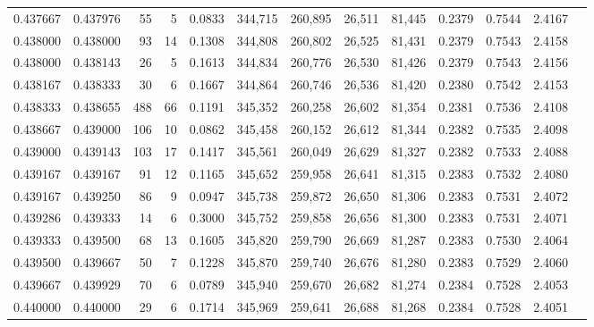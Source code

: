 \begin{tabular}{rrrrrrrrrrrrr}
0.437667 & 0.437976 &    55 &   5 &                                     0.0833 & 344,715 & 260,895 &  26,511 &  81,445 & 0.2379 & 0.7544 & 2.4167 \\
0.438000 & 0.438000 &    93 &  14 &                                     0.1308 & 344,808 & 260,802 &  26,525 &  81,431 & 0.2379 & 0.7543 & 2.4158 \\
0.438000 & 0.438143 &    26 &   5 &                                     0.1613 & 344,834 & 260,776 &  26,530 &  81,426 & 0.2379 & 0.7543 & 2.4156 \\
0.438167 & 0.438333 &    30 &   6 &                                     0.1667 & 344,864 & 260,746 &  26,536 &  81,420 & 0.2380 & 0.7542 & 2.4153 \\
0.438333 & 0.438655 &   488 &  66 &                                     0.1191 & 345,352 & 260,258 &  26,602 &  81,354 & 0.2381 & 0.7536 & 2.4108 \\
0.438667 & 0.439000 &   106 &  10 &                                     0.0862 & 345,458 & 260,152 &  26,612 &  81,344 & 0.2382 & 0.7535 & 2.4098 \\
0.439000 & 0.439143 &   103 &  17 &                                     0.1417 & 345,561 & 260,049 &  26,629 &  81,327 & 0.2382 & 0.7533 & 2.4088 \\
0.439167 & 0.439167 &    91 &  12 &                                     0.1165 & 345,652 & 259,958 &  26,641 &  81,315 & 0.2383 & 0.7532 & 2.4080 \\
0.439167 & 0.439250 &    86 &   9 &                                     0.0947 & 345,738 & 259,872 &  26,650 &  81,306 & 0.2383 & 0.7531 & 2.4072 \\
0.439286 & 0.439333 &    14 &   6 &                                     0.3000 & 345,752 & 259,858 &  26,656 &  81,300 & 0.2383 & 0.7531 & 2.4071 \\
0.439333 & 0.439500 &    68 &  13 &                                     0.1605 & 345,820 & 259,790 &  26,669 &  81,287 & 0.2383 & 0.7530 & 2.4064 \\
0.439500 & 0.439667 &    50 &   7 &                                     0.1228 & 345,870 & 259,740 &  26,676 &  81,280 & 0.2383 & 0.7529 & 2.4060 \\
0.439667 & 0.439929 &    70 &   6 &                                     0.0789 & 345,940 & 259,670 &  26,682 &  81,274 & 0.2384 & 0.7528 & 2.4053 \\
0.440000 & 0.440000 &    29 &   6 &                                     0.1714 & 345,969 & 259,641 &  26,688 &  81,268 & 0.2384 & 0.7528 & 2.4051 \\

\end{tabular}
